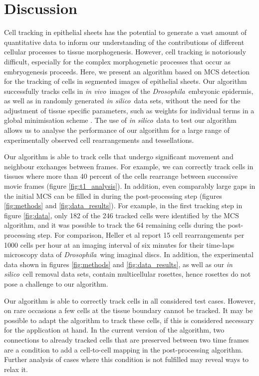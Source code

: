 \documentclass[a4paper,11pt]{article}
\newcommand{\Drosophila}{\textit{Drosophila}~}
\newcommand{\insilico}{\textit{in silico}~}
\newcommand{\invivo}{\textit{in vivo}~}
\begin{document}

\section{Discussion} \label{sec:discussion}

Cell tracking in epithelial sheets has the potential to generate a vast amount of quantitative data to inform our understanding of the contributions of different cellular processes to tissue morphogenesis. 
However, cell tracking is notoriously difficult, especially for the complex morphogenetic processes that occur as embryogenesis proceeds.
Here, we present an algorithm based on MCS detection for the tracking of cells in segmented images of epithelial sheets. 
Our algorithm successfully tracks cells in \invivo images of the \Drosophila embryonic epidermis, as well as in randomly generated \insilico data sets, without the need for the adjustment of tissue specific parameters, such as weights for individual terms in a global minimisation scheme \cite{Padfield2011}. 
The use of \insilico data to test our algorithm allows us to analyse the performance of our algorithm for a large range of experimentally observed cell rearrangements and tessellations. 

Our algorithm is able to track cells that undergo significant movement and neighbour exchanges between frames. 
For example, we can correctly track cells in tissues where more than 40 percent of the cells rearrange between successive movie frames (figure \ref{fig:t1_analysis}).
In addition, even comparably large gaps in the initial MCS can be filled in during the post-processing step (figures \ref{fig:methods} and \ref{fig:data_results}). 
For example, in the first tracking step in figure \ref{fig:data}, only 182 of the 246 tracked cells were identified by the MCS algorithm, and it was possible to track the 64 remaining cells during the post-processing step.  
For comparison, Heller et al \cite{Heller2016} report 15 cell rearrangements per 1000 cells per hour at an imaging interval of six minutes for their time-laps microscopy data of \Drosophila wing imaginal discs.
In addition, the experimental data shown in figures \ref{fig:methods} and \ref{fig:data_results}, as well as our \insilico cell removal data sets, contain multicellular rosettes, hence rosettes do not pose a challenge to our algorithm.

Our algorithm is able to correctly track cells in all considered test cases. However, on rare occasions a few cells at the tissue boundary cannot be tracked. 
It may be possible to adapt the algorithm to track these cells, if this is considered necessary for the application at hand. 
In the current version of the algorithm, two connections to already tracked cells that are preserved between two time frames are a condition to add a cell-to-cell mapping in the post-processing algorithm. 
Further analysis of cases where this condition is not fulfilled may reveal ways to relax it.
\end{document}
